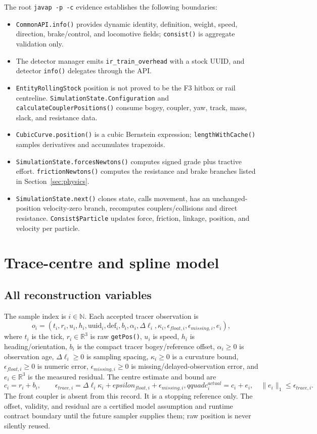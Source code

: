 \documentclass[10pt,a4paper]{article}
\newcommand{\model}{\textsf{certified model assumption}}
\newcommand{\runtime}{\textsf{runtime contract}}
\begin{document}
The root \texttt{javap -p -c} evidence establishes the following boundaries:
\begin{itemize}
 \item \texttt{CommonAPI.info()} provides dynamic identity, definition,
 weight, speed, direction, brake/control, and locomotive fields;
 \texttt{consist()} is aggregate validation only.
 \item The detector manager emits \texttt{ir\_train\_overhead} with a stock
 UUID, and detector \texttt{info()} delegates through the API.
 \item \texttt{EntityRollingStock} position is not proved to be the F3
 hitbox or rail centreline. \texttt{SimulationState.Configuration} and
 \texttt{calculateCouplerPositions()} consume bogey, coupler, yaw, track,
 mass, slack, and resistance data.
 \item \texttt{CubicCurve.position()} is a cubic Bernstein expression;
 \texttt{lengthWithCache()} samples derivatives and accumulates trapezoids.
 \item \texttt{SimulationState.forcesNewtons()} computes signed grade plus
 tractive effort. \texttt{frictionNewtons()} computes the resistance and
 brake branches listed in Section~\ref{sec:physics}.
 \item \texttt{SimulationState.next()} clones state, calls movement, has an
 unchanged-position velocity-zero branch, recomputes couplers/collisions and
 direct resistance. \texttt{Consist\$Particle} updates force, friction,
 linkage, position, and velocity per particle.
\end{itemize}

\section{Trace-centre and spline model}

\subsection{All reconstruction variables}

The sample index is $i\in\mathbb{N}$. Each accepted tracer observation is
\[
 o_i=(t_i,r_i,u_i,h_i,\mathrm{uuid}_i,\mathrm{def}_i,
      b_i,\alpha_i,\Delta\ell_i,\kappa_i,\epsilon_{float,i},
      \epsilon_{missing,i},e_i),
\]
where $t_i$ is the tick, $r_i\in\mathbb{R}^3$ is raw \texttt{getPos()},
$u_i$ is speed, $h_i$ is heading/orientation, $b_i$ is the compact tracer
bogey/reference offset, $\alpha_i\geq0$ is observation age,
$\Delta\ell_i\geq0$ is sampling spacing, $\kappa_i\geq0$ is a curvature
bound, $\epsilon_{float,i}\geq0$ is numeric error,
$\epsilon_{missing,i}\geq0$ is missing/delayed-observation error, and
$e_i\in\mathbb{R}^3$ is the measured residual. The centre estimate and bound
are
\[
 c_i=r_i+b_i,\qquad
 \epsilon_{trace,i}=\Delta\ell_i\kappa_i+epsilon_{float,i}
                         +\epsilon_{missing,i},qquad
 c_i^{actual}=c_i+e_i,\quad\|e_i\|_1\leq\epsilon_{trace,i}.
\]
The front coupler is absent from this record. It is a stopping reference only.
The offset, validity, and residual are a \model{} and \runtime{} boundary
until the future sampler supplies them; raw position is never silently reused.
\end{document}
